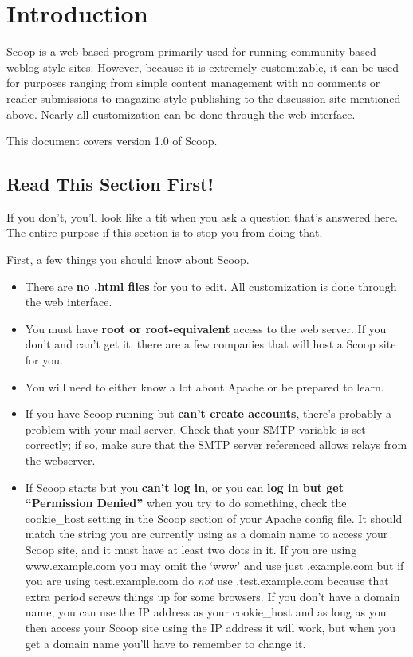 \section{Introduction}

Scoop is a web-based program primarily used for running community-based weblog-style sites.  However, because it is extremely customizable, it can be used for purposes ranging from simple content management with no comments or reader submissions to magazine-style publishing to the discussion site mentioned above.  Nearly all customization can be done through the web interface.

This document covers version 1.0 of Scoop.


\subsection{Read This Section First!}

If you don't, you'll look like a tit when you ask a question that's answered here.  The entire purpose if this section is to stop you from doing that.

First, a few things you should know about Scoop.  
\begin{itemize}
\item There are {\bf no .html files} for you to edit.  All customization is done through the web interface.
\item You must have {\bf root or root-equivalent} access to the web server.  If you don't and can't get it, there are a few companies that will host a Scoop site for you.
\item You will need to either know a lot about Apache or be prepared to learn.
\item If you have Scoop running but {\bf can't create accounts}, there's probably a problem with your mail server.  Check that your SMTP variable is set correctly; if so, make sure that the SMTP server referenced allows relays from the webserver.
\item If Scoop starts but you {\bf can't log in}, or you can {\bf log in but get ``Permission Denied''} when you try to do something, check the cookie\_host setting in the Scoop section of your Apache config file.  It should match the string you are currently using as a domain name to access your Scoop site, and it must have at least two dots in it.  If you are using www.example.com you may omit the `www' and use just .example.com but if you are using test.example.com do {\em not} use .test.example.com because that extra period screws things up for some browsers.  If you don't have a domain name, you can use the IP address as your cookie\_host and as long as you then access your Scoop site using the IP address it will work, but when you get a domain name you'll have to remember to change it.
\end{itemize} 

